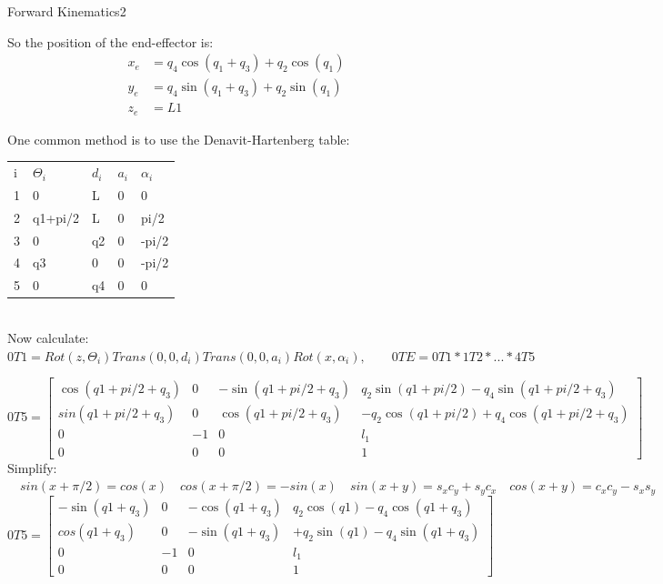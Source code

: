 \begin{questions}
\begin{question}{Forward Kinematics}{2}
\begin{answer}
	So the position of the end-effector is: 
	\begin{equation}
		\begin{split}
			x_e &= q_4\cos(q_1+q_3) + q_2\cos(q_1)\\
			y_e &= q_4\sin(q_1+q_3) + q_2\sin(q_1)\\
			z_e &= L1
		\end{split}
	\end{equation}

	One common method is to use the Denavit-Hartenberg table:\\
	\begin{tabular}{l l l l l}
		i&$\Theta_i$&$d_i$&$a_i$&$\alpha_i$\\
		1&0&L&0&0\\
		2&q1+pi/2&L&0&pi/2\\
		3&0&q2&0&-pi/2\\
		4&q3&0&0&-pi/2\\
		5&0&q4&0&0\\
	\end{tabular}\\
	Now calculate: $0T1=Rot(z,\Theta_i)Trans(0,0,d_i)Trans(0,0,a_i)Rot(x,\alpha_i), \qquad 0TE=0T1*1T2*...*4T5$
	
	\begin{equation}
	0T5=
	\left[\begin{matrix}\cos{  (q1+pi/2 + q_{3}   )} & 0 & - \sin{  (q1+pi/2 + q_{3}   )} & q_{2} \sin{  (q1+pi/2   )} - q_{4} \sin{  (q1+pi/2 + q_{3}   )}\\sin{  (q1+pi/2 + q_{3}   )} & 0 & \cos{  (q1+pi/2 + q_{3}   )} & - q_{2} \cos{  (q1+pi/2   )} + q_{4} \cos{  (q1+pi/2 + q_{3}   )}\\0 & -1 & 0 & l_{1}\\0 & 0 & 0 & 1\end{matrix} \right]
	\end{equation}
	Simplify: $\quad sin(x+\pi/2)=cos(x)\quad cos(x+\pi/2)=-sin(x) \quad sin(x+y)=s_x c_y+s_y c_x \quad cos(x+y)=c_x c_y - s_x s_y$\\
	\begin{equation}
	0T5=
	\left[\begin{matrix}-\sin{  (q1+ q_{3}   )} & 0 & - \cos{  (q1+ q_{3}   )} & q_{2} \cos{  (q1  )} - q_{4} \cos{  (q1+ q_{3}   )}\\cos{  (q1+ q_{3}   )} & 0 & -\sin{  (q1 + q_{3}   )} & + q_{2} \sin{  (q1 )} - q_{4} \sin{  (q1 + q_{3}   )}\\0 & -1 & 0 & l_{1}\\0 & 0 & 0 & 1\end{matrix} \right]
	\end{equation}
	

\end{answer}
\end{question}
\end{questions}
